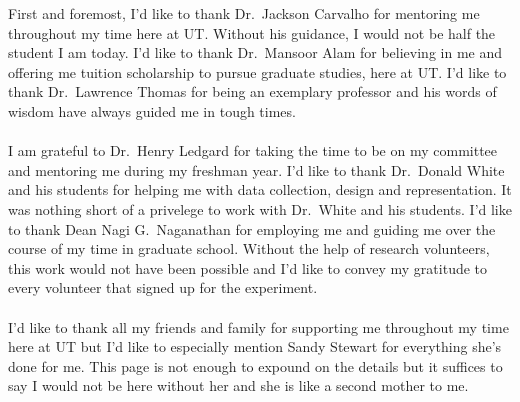 \documentclass[12pt]{uthesis-v12}  %
\begin{document}

\begin{acknowledgments}
\noindent First and foremost, I'd like to thank Dr.~Jackson Carvalho for mentoring me throughout my time here at UT. Without his guidance, I would not be half the student I am today. I'd like to thank Dr.~Mansoor Alam for believing in me and offering me tuition scholarship to pursue graduate studies, here at UT. I'd like to thank Dr.~Lawrence Thomas for being an exemplary professor and his words of wisdom have always guided me in tough times.\\\\I am grateful to Dr.~Henry Ledgard for taking the time to be on my committee and mentoring me during my freshman year. I'd like to thank Dr.~Donald White and his students for helping me with data collection, design and representation. It was nothing short of a privelege to work with Dr.~White and his students. I'd like to thank Dean Nagi G.~Naganathan for employing me and guiding me over the course of my time in graduate school. Without the help of research volunteers, this work would not have been possible and I'd like to convey my gratitude to every volunteer that signed up for the experiment.\\\\
I'd like to thank all my friends and family for supporting me throughout my time here at UT but I'd like to especially mention Sandy Stewart for everything she's done for me. This page is not enough to expound on the details but it suffices to say I would not be here without her and she is like a second mother to me.  
\end{acknowledgments}
\end{document}
